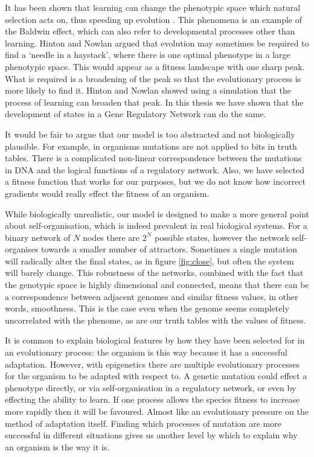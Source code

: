 \documentclass[a4paper,11pt]{article}
\begin{document}
It has been shown that learning can change the phenotypic space which natural selection acts on, thus speeding up evolution \citep{Hinton1987}. This phenomena is an example of the Baldwin effect, which can also refer to developmental processes other than learning. Hinton and Nowlan argued that evolution may sometimes be required to find a `needle in a haystack', where there is one optimal phenotype in a large phenotypic space. This would appear as a fitness landscape with one sharp peak. What is required is a broadening of the peak so that the evolutionary process is more likely to find it. Hinton and Nowlan showed using a simulation that the process of learning can broaden that peak. In this thesis we have shown that the development of states in a Gene Regulatory Network can do the same.\par

It would be fair to argue that our model is too abstracted and not biologically plausible. For example, in organisms mutations are not applied to bits in truth tables. There is a complicated non-linear correspondence between the mutations in DNA and the logical functions of a regulatory network. Also, we have selected a fitness function that works for our purposes, but we do not know how incorrect gradients would really effect the fitness of an organism.\par

While biologically unrealistic, our model is designed to make a more general point about self-organisation, which is indeed prevalent in real biological systems. For a binary network of $N$ nodes there are $2^N$ possible states, however the network self-organises towards a smaller number of attractors. Sometimes a single mutation will radically alter the final states, as in figure \ref{fig:close}, but often the system will barely change. This robustness of the networks, combined with the fact that the genotypic space is highly dimensional and connected, means that there can be a correspondence between adjacent genomes and similar fitness values, in other words, smoothness. This is the case even when the genome seems completely uncorrelated with the phenome, as are our truth tables with the values of fitness.\par

It is common to explain biological features by how they have been selected for in an evolutionary process: the organism is this way because it has a successful adaptation. However, with epigenetics there are multiple evolutionary processes for the organism to be adapted with respect to. A genetic mutation could effect a phenotype directly, or via self-organisation in a regulatory network, or even by effecting the ability to learn. If one process allows the species fitness to increase more rapidly then it will be favoured. Almost like an evolutionary pressure on the method of adaptation itself. Finding which processes of mutation are more successful in different situations gives us another level by which to explain why an organism is the way it is.\par
\end{document}
